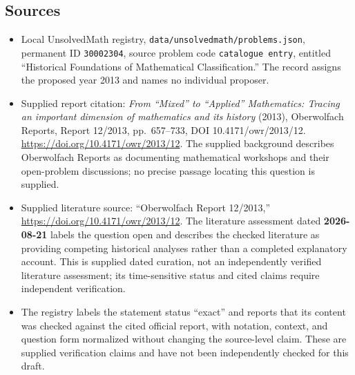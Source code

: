\documentclass[11pt]{article}
\begin{document}
\subsection{Sources}
\begin{itemize}
\item Local UnsolvedMath registry, \texttt{data/unsolvedmath/problems.json}, permanent ID \texttt{30002304}, source problem code \texttt{catalogue entry}, entitled ``Historical Foundations of Mathematical Classification.'' The record assigns the proposed year 2013 and names no individual proposer.
\item Supplied report citation: \emph{From ``Mixed'' to ``Applied'' Mathematics: Tracing an important dimension of mathematics and its history} (2013), Oberwolfach Reports, Report 12/2013, pp.\ 657--733, DOI 10.4171/owr/2013/12. \url{https://doi.org/10.4171/owr/2013/12}. The supplied background describes Oberwolfach Reports as documenting mathematical workshops and their open-problem discussions; no precise passage locating this question is supplied.
\item Supplied literature source: ``Oberwolfach Report 12/2013,'' \url{https://doi.org/10.4171/owr/2013/12}. The literature assessment dated \textbf{2026-08-21} labels the question open and describes the checked literature as providing competing historical analyses rather than a completed explanatory account. This is supplied dated curation, not an independently verified literature assessment; its time-sensitive status and cited claims require independent verification.
\item The registry labels the statement status ``exact'' and reports that its content was checked against the cited official report, with notation, context, and question form normalized without changing the source-level claim. These are supplied verification claims and have not been independently checked for this draft.
\end{itemize}
\end{document}
